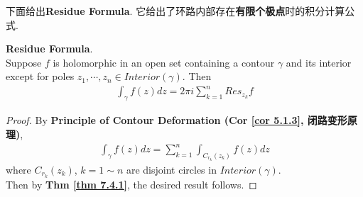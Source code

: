 	\newpage
	下面给出\textbf{Residue Formula}. 它给出了环路内部存在\textbf{有限个极点}时的积分计算公式.
	\begin{thm}\label{thm 7.4.2}
		\textbf{Residue Formula}.\\
		Suppose $f$ is holomorphic in an open set containing a contour $\gamma$ and its interior except for poles $z_1 , \cdots , z_n \in Interior(\gamma)$. Then
		\begin{align}
			\int_{\gamma}{f(z) dz} = 2 \pi i \sum_{k = 1}^{n}{Res_{z_k}f}
		\end{align}
	
		\vspace{2em}
		\begin{proof}
			By \textbf{Principle of Contour Deformation (Cor \ref{cor 5.1.3}, 闭路变形原理)},
			\begin{align}
				\int_{\gamma}{f(z) dz} = \sum_{k = 1}^{n}{\int_{C_{r_k}(z_k)}{f(z) dz}}
			\end{align}
			where $C_{r_k}(z_k)$, $k = 1 \sim n$ are disjoint circles in $Interior(\gamma)$.\\
			Then by \textbf{Thm \ref{thm 7.4.1}}, the desired result follows.
		\end{proof}
	\end{thm}

\newpage

